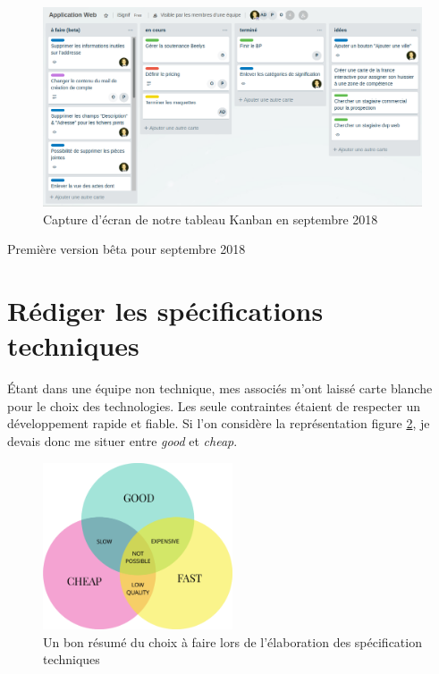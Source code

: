 \documentclass[]{report}
\begin{document}
      \begin{figure}
        \includegraphics[width=\linewidth]{img/trello.png}
        \caption{Capture d'écran de notre tableau Kanban en septembre 2018}
        \label{fig:trello}
      \end{figure}

      Première version bêta pour septembre 2018

  \section{Rédiger les spécifications techniques}

    Étant dans une équipe non technique, mes associés m'ont laissé carte blanche pour le choix des technologies. Les seule contraintes étaient de respecter un développement rapide et fiable. Si l'on considère la représentation figure \ref{fig:good_cheap_fast}, je devais donc me situer entre \textit{good} et \textit{cheap}.

    \begin{figure}
      \includegraphics[width=0.5\textwidth]{img/good_cheap_fast.png}
      \caption{Un bon résumé du choix à faire lors de l'élaboration des spécification techniques}
      \label{fig:good_cheap_fast}
    \end{figure}
\end{document}
